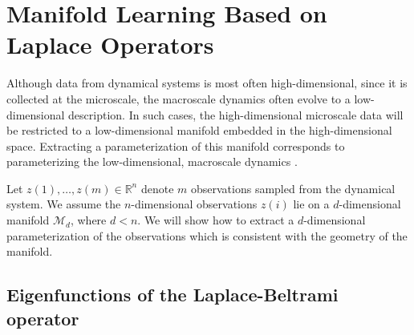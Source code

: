 \documentclass[preprint]{elsarticle}
\begin{document}
\section{Manifold Learning Based on Laplace Operators}

Although data from dynamical systems is most often high-dimensional, since it is collected at the microscale, the macroscale dynamics often evolve to a low-dimensional description. 
%
In such cases, the high-dimensional microscale data will be restricted to a low-dimensional manifold embedded in the high-dimensional space. 
%
Extracting a parameterization of this manifold corresponds to parameterizing the low-dimensional, macroscale dynamics \cite{...}.

Let $z(1), \dots, z(m) \in \mathbb{R}^n$ denote $m$ observations sampled from the dynamical system. 
%
We assume the $n$-dimensional observations $z(i)$ lie on a $d$-dimensional manifold $\mathcal{M}_d$, where $d < n$. 
%
We will show how to extract a $d$-dimensional parameterization of the observations which is consistent with the geometry of the manifold. 

\subsection{Eigenfunctions of the Laplace-Beltrami operator}
\end{document}
